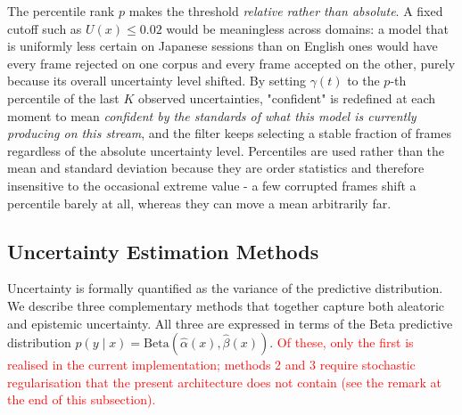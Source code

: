 \documentclass[11pt,a4paper]{article}
\begin{document}
    The percentile rank $p$ makes the threshold \emph{relative rather than absolute}. A fixed cutoff such as $U(x) \le 0.02$ would be meaningless across domains: a model that is uniformly less certain on Japanese sessions than on English ones would have every frame rejected on one corpus and every frame accepted on the other, purely because its overall uncertainty level shifted. By setting $\gamma(t)$ to the $p$-th percentile of the last $K$ observed uncertainties, "confident" is redefined at each moment to mean \emph{confident by the standards of what this model is currently producing on this stream}, and the filter keeps selecting a stable fraction of frames regardless of the absolute uncertainty level. Percentiles are used rather than the mean and standard deviation because they are order statistics and therefore insensitive to the occasional extreme value - a few corrupted frames shift a percentile barely at all, whereas they can move a mean arbitrarily far.

	\subsection{Uncertainty Estimation Methods}
	
	Uncertainty is formally quantified as the variance of the predictive distribution. We describe three complementary methods that together capture both aleatoric and epistemic uncertainty. All three are expressed in terms of the Beta predictive distribution $p(y \mid x) = \mathrm{Beta}(\hat{\alpha}(x),\hat{\beta}(x))$. \textcolor{red}{Of these, only the first is realised in the current implementation; methods 2 and 3 require stochastic regularisation that the present architecture does not contain (see the remark at the end of this subsection).}
	
\end{document}
